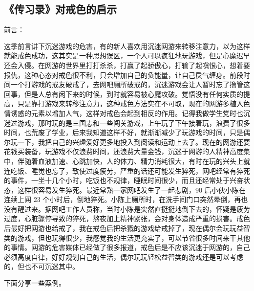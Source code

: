 \subsection{《传习录》对戒色的启示}

前言：

这季前言讲下沉迷游戏的危害，有的新人喜欢用沉迷网游来转移注意力，以为这样就能戒色成功，这其实是一种思想误区，一个人可以疯狂地玩游戏，但是心魔迟早还会入侵。在网游的世界里打打杀杀，打赢了起骄傲心，打输了起嗔恨心，想着要报仇，这种心态对戒色很不利，只会增加自己的负能量，让自己戾气缠身。前段时间一个打游戏的戒友破戒了，去网吧厕所破戒的，沉迷游戏会让人暂时忘了撸管这回事，但是人总有闲下来的时候，到时就容易被心魔攻破。觉悟没有任何实质的提高，只是靠打游戏来转移注意力，这种戒色方法实在不可取，现在的网游多植入色情诱惑的元素以增加人气，这样对戒色会起到相反的作用。记得我做学生党时也沉迷过游戏，那时玩的是三国志和一些闯关游戏，上午玩了下午接着玩，浪费了很多时间，也荒废了学业，后来我知道这样不好，就渐渐减少了玩游戏的时间，只是偶尔玩一下，我把自己的兴趣爱好更多地投入到阅读和运动上去了。现在的网游还要花钱买装备，玩游戏不仅浪费时间，还浪费大量金钱，沉迷于网游的人精神高度集中，伴随着血液加速、心跳加快，人的体力、精力消耗很大，有时在玩的兴头上就连吃饭、睡觉也忘了，致使过度疲劳，严重的话还可能发生猝死，网吧经常有猝死的事件，一坐十几个小时，吃饭也不规律，睡眠时间很少，而且还经常处于兴奋状态，这样很容易发生猝死。最近常熟一家网吧发生了一起悲剧，90 后小伙小陈在连续上网 23 个小时后，倒地猝死。小陈上厕所时，在洗手间门口突然晕倒，再也没有醒过来。据网吧工作人员称，当时小陈是突然直挺挺地倒下去的，怀疑是疲劳过度，心脏骤停导致的猝死，熬夜加上精神紧张，会对身体造成严重的损害。戒色后最好把网游也给戒了，我在戒色后把杀戮的游戏给戒掉了，现在偶尔会玩玩益智类的游戏，但也玩得很少，我感觉我的生活更充实了，可以节省很多时间来干其他的事情。网游的危害媒体已经做了很多报道，戒色后是不应该沉迷于网游的，自己必须高度自律，好好规划自己的生活，偶尔玩玩轻松益智类的游戏还是可以考虑的，但也不可沉迷其中。

下面分享一些案例。

